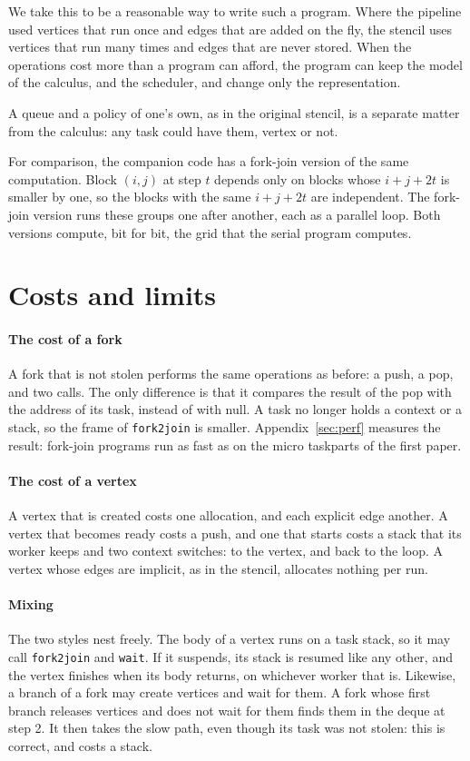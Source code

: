 \documentclass[sigplan,nonacm]{acmart}
\begin{document}
We take this to be a reasonable way to write such a program.
%
Where the pipeline used vertices that run once and edges that are
added on the fly, the stencil uses vertices that run many times and
edges that are never stored.
%
When the operations cost more than a program can afford, the program
can keep the model of the calculus, and the scheduler, and change only
the representation.

A queue and a policy of one's own, as in the original stencil, is a
separate matter from the calculus: any task could have them, vertex or
not.

For comparison, the companion code has a fork-join version of the same
computation.
%
Block $(i, j)$ at step $t$ depends only on blocks whose
$i + j + 2t$ is smaller by one, so the blocks with the same
$i + j + 2t$ are independent.
%
The fork-join version runs these groups one after another, each as a
parallel loop.
%
Both versions compute, bit for bit, the grid that the serial program
computes.

\section{Costs and limits}
\label{sec:costs}

\paragraph{The cost of a fork}
%
A fork that is not stolen performs the same operations as before:
a push, a pop, and two calls.
%
The only difference is that it compares the result of the pop with the
address of its task, instead of with null.
%
A task no longer holds a context or a stack, so the frame of
\lstinline|fork2join| is smaller.
%
Appendix~\ref{sec:perf} measures the result: fork-join programs run
as fast as on the micro taskparts of the first paper.

\paragraph{The cost of a vertex}
%
A vertex that is created costs one allocation, and each explicit edge
another.
%
A vertex that becomes ready costs a push, and one that starts costs a
stack that its worker keeps and two context switches: to the vertex,
and back to the loop.
%
A vertex whose edges are implicit, as in the stencil, allocates
nothing per run.

\paragraph{Mixing}
%
The two styles nest freely.
%
The body of a vertex runs on a task stack, so it may call
\lstinline|fork2join| and \lstinline|wait|.
%
If it suspends, its stack is resumed like any other, and the vertex
finishes when its body returns, on whichever worker that is.
%
Likewise, a branch of a fork may create vertices and wait for them.
%
A fork whose first branch releases vertices and does not wait for them
finds them in the deque at step 2.
%
It then takes the slow path, even though its task was not stolen: this
is correct, and costs a stack.
\end{document}
